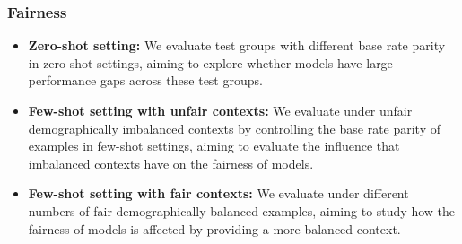 \subsubsection*{Fairness}
\begin{itemize}
    \item  \textbf{Zero-shot setting:} We evaluate test groups with different base rate parity in zero-shot settings, aiming to explore whether models have large performance gaps across these test groups.
    \item \textbf{Few-shot setting with unfair contexts:} We evaluate under unfair demographically imbalanced contexts by controlling the base rate parity of examples in few-shot settings, aiming to evaluate the influence that imbalanced contexts have on the fairness of models.
    \item \textbf{Few-shot setting with fair contexts:} We evaluate under different numbers of fair demographically balanced examples, aiming to study how the fairness of models is affected by providing a more balanced context.
\end{itemize}
\newpage

